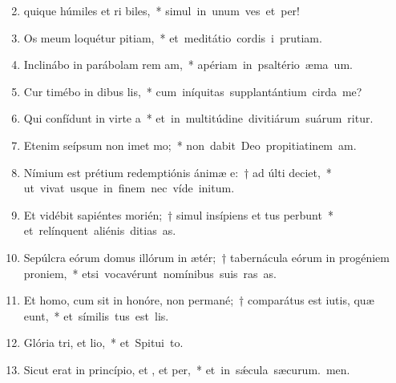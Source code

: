 \begin{flushleft}
\begin{enumerate}[leftmargin=*]
\setcounter{enumi}{1}

\item quique húmiles et ri biles,~* \mbox{simul in unum ves et per!}

\item Os meum loquétur pitiam,~* \mbox{et meditátio cordis i prutiam.}

\item Inclinábo in parábolam rem am,~* \mbox{apériam in psaltério æma um.}

\item Cur timébo in dibus lis,~* \mbox{cum iníquitas supplantántium cirda me?}

\item Qui confídunt in virte a~* \mbox{et in multitúdine divitiárum suárum ritur.}

\item Etenim seípsum non imet mo;~* \mbox{non dabit Deo propitiatinem am.}

\item Nímium est prétium redemptiónis ánimæ e:~† ad últi deciet,~* \mbox{ut vivat usque in finem nec víde initum.}

\item Et vidébit sapiéntes morién;~† simul insípiens et tus perbunt~* \mbox{et relínquent aliénis ditias as.}

\item Sepúlcra eórum domus illórum in ætér;~† tabernácula eórum in progéniem  proniem,~* \mbox{etsi vocavérunt nomínibus suis ras as.}

\item Et homo, cum sit in honóre, non permané;~† comparátus est iutis, quæ eunt,~* \mbox{et símilis tus est lis.}

\item Glória tri, et lio,~* \mbox{et Spitui to.}

\item Sicut erat in princípio, et , et per,~* \mbox{et in s\'{\ae}cula sæcurum. men.}

\end{enumerate}
\end{flushleft}

